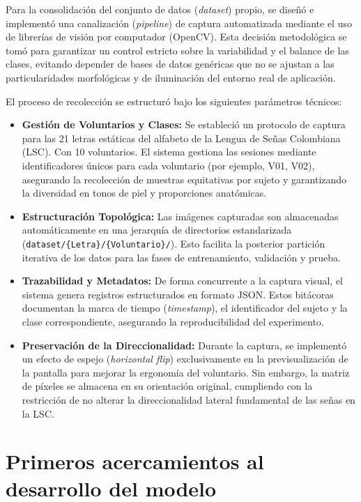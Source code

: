 \documentclass[12pt,letterpaper]{article}
\begin{document}
Para la consolidación del conjunto de datos (\textit{dataset}) propio, se diseñó e implementó una canalización (\textit{pipeline}) de captura automatizada mediante el uso de librerías de visión por computador (OpenCV). Esta decisión metodológica se tomó para garantizar un control estricto sobre la variabilidad y el balance de las clases, evitando depender de bases de datos genéricas que no se ajustan a las particularidades morfológicas y de iluminación del entorno real de aplicación.

El proceso de recolección se estructuró bajo los siguientes parámetros técnicos:
\begin{itemize}
    \item \textbf{Gestión de Voluntarios y Clases:} Se estableció un protocolo de captura para las 21 letras estáticas del alfabeto de la Lengua de Señas Colombiana (LSC). Con 10 voluntarios. El sistema gestiona las sesiones mediante identificadores únicos para cada voluntario (por ejemplo, V01, V02), asegurando la recolección de muestras equitativas por sujeto y garantizando la diversidad en tonos de piel y proporciones anatómicas.
    \item \textbf{Estructuración Topológica:} Las imágenes capturadas son almacenadas automáticamente en una jerarquía de directorios estandarizada (\texttt{dataset/\{Letra\}/\{Voluntario\}/}). Esto facilita la posterior partición iterativa de los datos para las fases de entrenamiento, validación y prueba.
    \item \textbf{Trazabilidad y Metadatos:} De forma concurrente a la captura visual, el sistema genera registros estructurados en formato JSON. Estos bitácoras documentan la marca de tiempo (\textit{timestamp}), el identificador del sujeto y la clase correspondiente, asegurando la reproducibilidad del experimento.
    \item \textbf{Preservación de la Direccionalidad:} Durante la captura, se implementó un efecto de espejo (\textit{horizontal flip}) exclusivamente en la previsualización de la pantalla para mejorar la ergonomía del voluntario. Sin embargo, la matriz de píxeles se almacena en su orientación original, cumpliendo con la restricción de no alterar la direccionalidad lateral fundamental de las señas en la LSC.
\end{itemize}

\section{Primeros acercamientos al desarrollo del modelo}
\end{document}
